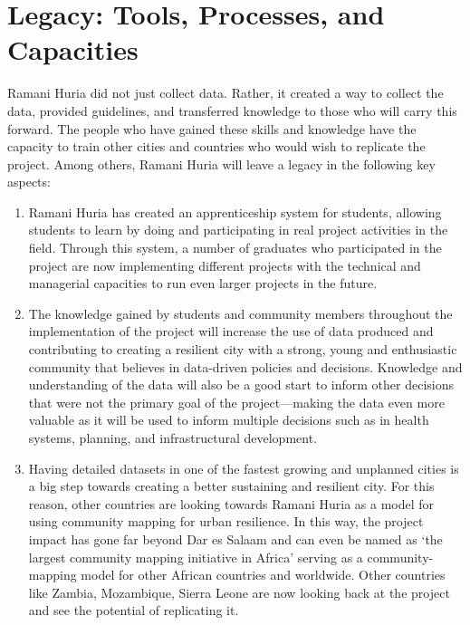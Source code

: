 \documentclass[a4paper,12pt,twoside]{article}
\begin{document}
\section{Legacy: Tools, Processes, and Capacities}
\begin{multicols}{2}
Ramani Huria did not just collect data. Rather, it created a way to collect the data, provided guidelines, and transferred knowledge to those who will carry this forward. The people who have gained these skills and knowledge have the capacity to train other cities and countries who would wish to replicate the project. Among others, Ramani Huria will leave a legacy in the following key aspects:
\end{multicols}
\begin{mdframed}[hidealllines=true,backgroundcolor=RHgreen!10,innerleftmargin=6pt,innerrightmargin=6pt,leftmargin=-3pt,rightmargin=-3pt]
\begin{enumerate}
    \item Ramani Huria has created an apprenticeship system for students, allowing students to learn by doing and participating in real project activities in the field. Through this system, a number of graduates who participated in the project are now implementing different projects with the technical and managerial capacities to run even larger projects in the future.
    \item The knowledge gained by students and community members throughout the implementation of the project will increase the use of data produced and contributing to creating a resilient city with a strong, young and enthusiastic community that believes in data-driven policies and decisions. Knowledge and understanding of the data will also be a good start to inform other decisions that were not the primary goal of the project---making the data even more valuable as it will be used to inform multiple decisions such as in health systems, planning, and infrastructural development.
    \item Having detailed datasets in one of the fastest growing and unplanned cities is a big step towards creating a better sustaining and resilient city. For this reason, other countries are looking towards Ramani Huria as a model for using community mapping for urban resilience. In this way, the project impact has gone far beyond Dar es Salaam and can even be named as  ‘the largest community mapping initiative in Africa’ serving as a community-mapping model for other African countries and worldwide. Other countries like Zambia, Mozambique, Sierra Leone are now looking back at the project and see the potential of replicating it.
\end{enumerate}
\end{mdframed}
\end{document}
